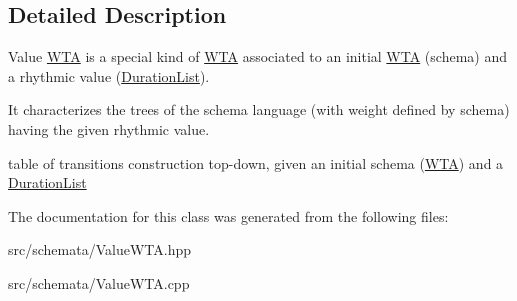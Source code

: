 \subsection{Detailed Description}
Value \mbox{\hyperlink{classWTA}{W\+TA}} is a special kind of \mbox{\hyperlink{classWTA}{W\+TA}} associated to an initial \mbox{\hyperlink{classWTA}{W\+TA}} (schema) and a rhythmic value (\mbox{\hyperlink{classDurationList}{Duration\+List}}). 

It characterizes the trees of the schema language (with weight defined by schema) having the given rhythmic value.

table of transitions construction top-\/down, given an initial schema (\mbox{\hyperlink{classWTA}{W\+TA}}) and a \mbox{\hyperlink{classDurationList}{Duration\+List}} 

The documentation for this class was generated from the following files\+:\begin{DoxyCompactItemize}
\item 
src/schemata/Value\+W\+T\+A.\+hpp\item 
src/schemata/Value\+W\+T\+A.\+cpp\end{DoxyCompactItemize}
